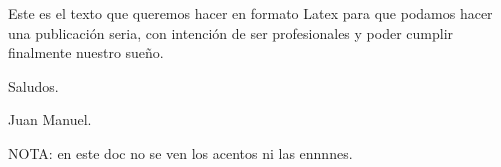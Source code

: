 \documentclass{article}
\begin{document}
Este es el texto que queremos hacer en formato Latex para que podamos hacer una publicación seria, con intención de ser profesionales y poder cumplir finalmente nuestro sueño.

Saludos.

Juan Manuel.

NOTA: en este doc no se ven los acentos ni las ennnnes.
\end{document}
